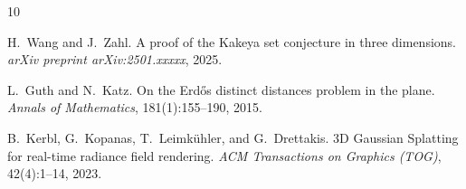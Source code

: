 \documentclass[10pt,twocolumn]{article}
\begin{document}

\begin{thebibliography}{10}

H.~Wang and J.~Zahl.
\newblock A proof of the Kakeya set conjecture in three dimensions.
\newblock \emph{arXiv preprint arXiv:2501.xxxxx}, 2025.

L.~Guth and N.~Katz.
\newblock On the Erd\H{o}s distinct distances problem in the plane.
\newblock \emph{Annals of Mathematics}, 181(1):155--190, 2015.

B.~Kerbl, G.~Kopanas, T.~Leimk\"uhler, and G.~Drettakis.
\newblock 3D Gaussian Splatting for real-time radiance field rendering.
\newblock \emph{ACM Transactions on Graphics (TOG)}, 42(4):1--14, 2023.

\end{thebibliography}
\end{document}

